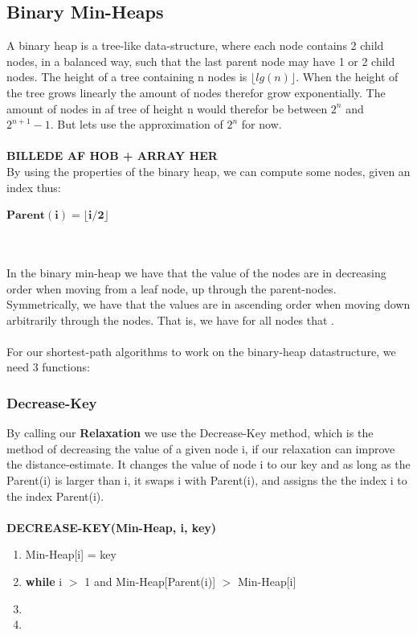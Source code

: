 \documentclass[11pt]{article}
\begin{document}
\subsection{Binary Min-Heaps}
A binary heap is a tree-like data-structure, where each node contains 2 child nodes, in a balanced way, such that the last parent node may have 1 or 2 child nodes. The height of a tree containing n nodes is $\lfloor lg(n) \rfloor$. When the height of the tree grows linearly the amount of nodes therefor grow exponentially. The amount of nodes in af tree of height n would therefor be between $2^n$ and $2^{n+1}-1$. But lets use the approximation of $2^n$ for now.\\\\
\textbf{BILLEDE AF HOB + ARRAY HER}\\
By using the properties of the binary heap, we can compute some nodes, given an index thus:\\
\begin{center}
$\pmb{Parent(i) = \lfloor i/2 \rfloor}$\\
\\
\\
\end{center}
In the binary min-heap we have that the value of the nodes are in decreasing order when moving from a leaf node, up through the parent-nodes. Symmetrically, we have that the values are in ascending order when moving down arbitrarily through the nodes. That is, we have for all nodes that .\\\\
For our shortest-path algorithms to work on the binary-heap datastructure, we need 3 functions:
\subsubsection{Decrease-Key}
By calling our \textbf{Relaxation} we use the Decrease-Key method, which is the method of decreasing the value of a given node i, if our relaxation can improve the distance-estimate. It changes the value of node i to our key and as long as the Parent(i) is larger than i, it swaps i with Parent(i), and assigns the the index i to the index Parent(i).\\\\
\textbf{DECREASE-KEY(Min-Heap, i, key)}
\begin{enumerate}
\setlength\itemsep{0em}
\item Min-Heap[i] = key
\item \textbf{while } i $>$ 1 and Min-Heap[Parent(i)] $>$ Min-Heap[i]
\item {}
\item {}
\end{enumerate}
\end{document}
